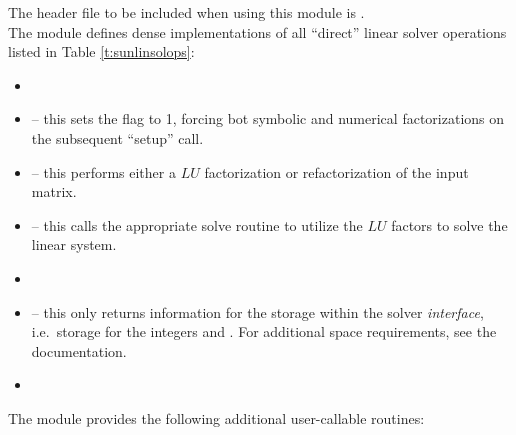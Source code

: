 \noindent The header file to be included when using this module 
is . \\
The {\sunlinsolklu} module defines dense implementations of all
``direct'' linear solver operations listed in
Table \ref{t:sunlinsolops}:
\begin{itemize}
\item {}
\item {} -- this sets the
   flag to 1, forcing bot symbolic and numerical
  factorizations on the subsequent ``setup'' call.
\item {} -- this performs either a $LU$
  factorization or refactorization of the input matrix.
\item {} -- this calls the appropriate {\klu}
  solve routine to utilize the $LU$ factors to solve the linear
  system. 
\item {}
\item {} -- this only returns information for
  the storage within the solver \emph{interface}, i.e.~storage for the
  integers  and .  For additional
  space requirements, see the {\klu} documentation.
\item {}
\end{itemize}
The module {\sunlinsolklu} provides the following additional
user-callable routines: 
